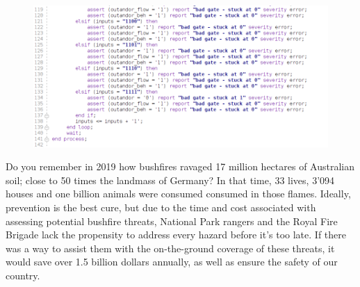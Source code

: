 \documentclass[12pt,a4paper]{article}
\begin{document}
\begin{figure}[H]
    \centering
    \includegraphics[scale=0.25]{images/code 5.png}
\end{figure}



Do you remember in 2019 how bushfires ravaged 17 million hectares of Australian soil;  close to 50 times the landmass of Germany? In that time, 33 lives, 3'094 houses and one billion animals were consumed consumed in those flames. Ideally, prevention is the best cure, but due to the time and cost associated with assessing potential bushfire threats, National Park rangers and the Royal Fire Brigade lack the propensity to address every hazard before it's too late. If there was a way to assist them with the on-the-ground coverage of these threats, it would save over 1.5 billion dollars annually, as well as ensure the safety of our country. 
\end{document}
